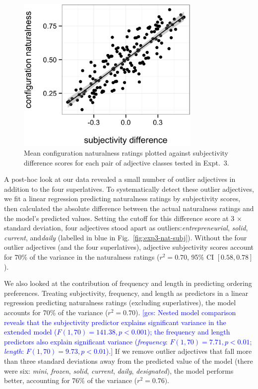 \documentclass[12pt]{article}
\newcommand{\gcs}[1]{\textcolor{blue}{[gcs: #1]}}
\newcommand{\ndg}[1]{\textcolor{Green}{[ndg: #1]}}
\begin{document}
\begin{figure}
	\centering\includegraphics[width=3.5in]{plots/naturalness-subjectivity_class-difference_no-sup.eps}
	\caption{Mean configuration naturalness ratings plotted against subjectivity difference scores for each pair of adjective classes tested in Expt.~3. 
		}\label{fig:exp3-nat-subj-diff}
\end{figure}

A post-hoc look at our data revealed a small number of outlier adjectives in addition to the four superlatives. To systematically detect these outlier adjectives, we fit a linear regression predicting naturalness ratings by subjectivity scores, then calculated the absolute difference between the actual naturalness ratings and the model's predicted values. Setting the cutoff for this difference score at 3 $\times$ standard deviation, four adjectives stood apart as outliers: ​\emph{entrepreneurial}, ​\emph{solid}, ​\emph{current}, and ​\emph{daily} (labelled in blue in Fig.~\ref{fig:exp3-nat-subj}). Without the four outlier adjectives (and the four superlatives), adjective subjectivity scores account for 70\% of the variance in the naturalness ratings ($r^2=0.70$, 95\% CI $[0.58,  0.78]$).

We also looked at the contribution of frequency and length in predicting ordering preferences. Treating subjectivity, frequency, and length as predictors in a linear regression predicting naturalness ratings (excluding superlatives), the model accounts for 70\% of the variance ($r^{2}=0.70$). \gcs{Nested model comparison reveals that the subjectivity predictor explains significant variance in the extended model ($F(1,70) = 141.38, p < 0.001$); the frequency and length predictors also explain significant variance (\emph{frequency}: $F(1,70) = 7.71, p < 0.01$; \emph{length}: $F(1,70) = 9.73, p < 0.01$).}
If we remove outlier adjectives that fall more than three standard deviations away from the predicted value of the model (there were six: \emph{mini}, \emph{frozen}, \emph{solid}, \emph{current}, \emph{daily}, \emph{designated}), the model performs better, accounting for 76\% of the variance ($r^{2}=0.76)$.
\end{document}
